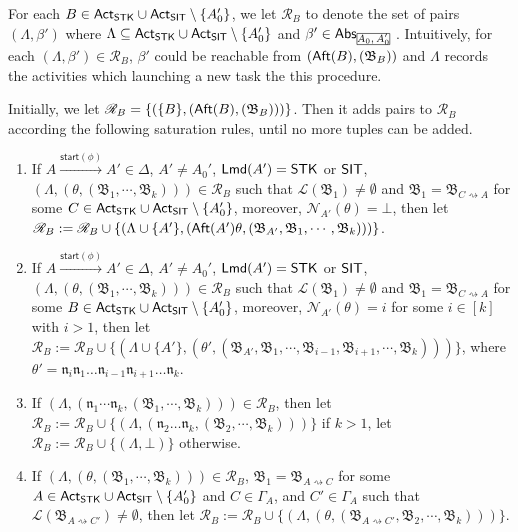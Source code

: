 \documentclass[preprint,12pt]{elsarticle}
\newcommand\rectangled[1]{\tikz[baseline=(torect.base)]{
    \node[shape = rectangle, draw, inner sep=0pt, outer sep = 0pt] (torect) {#1}
    }
}
\newcommand{\mrectangled}[1]{\text{\rectangled{\ensuremath{#1}}}}
\newcommand{\mhcancel}[1]{\mrectangled{#1}}
\newcommand\act{{\sf Act}}
\newcommand\aft{{\sf Aft}}
\newcommand\lmd{{\sf Lmd}}
\newcommand\singletask{{\sf STK}}
\newcommand\singleinstance{{\sf SIT}}
\newcommand\startactivity{{\mathsf{start} }}
\newcommand\abs{{\mathsf{Abs} }}
\newcommand\namefun{\mathcal{N}}
\newcommand\aname{\mathfrak{n}}
\newcommand\AutReach{\mathscr{R}}
\newcommand{\STK}{\mathsf{STK}}
\newcommand{\SIT}{\mathsf{SIT}}
\newcommand\AutB{{\mathfrak{B} }}
\newcommand\Lang{{\mathscr{L} }}
\begin{document}
{For each $B\in\act_{\STK}\cup\act_{\SIT}\setminus\{A_0'\}$, we let $\AutReach_{B}$ to denote the set of pairs $(\Lambda, \beta')$ where $\Lambda \subseteq \act_{\STK}\cup\act_{\SIT}\setminus\{A_0'\}$ and $\beta' \in \abs_{\mhcancel{A_0, A_0'}}$. Intuitively, for each $(\Lambda, \beta') \in \AutReach_{B}$, $\beta'$ could be reachable from $(\aft(B),(\AutB_{B}))$ and $\Lambda$ records the activities which launching a new task the this procedure.

Initially, we let $\AutReach_{B} = \{(\{B\}, (\aft(B), (\AutB_B)))\}$. Then it adds pairs to $\AutReach_{B}$ according the following saturation rules, until no more tuples can be added.

\smallskip
\fbox
{
\begin{minipage}{0.9\textwidth}
\begin{enumerate}
    \item If $A \xrightarrow{\startactivity(\phi)}A' \in\Delta$, $A'\neq A_0'$, $\lmd(A')=\STK$ or $\singleinstance$, $(\Lambda,(\theta, (\AutB_1,\cdots,\AutB_k))) \in \AutReach_{B}$ such that $\Lang(\AutB_1) \neq \emptyset$ and $\AutB_1 = \AutB_{C\rightsquigarrow A}$ for some $C \in \act_\singletask\cup\act_\singleinstance\setminus\{A_0'\}$, moreover, $\namefun_{A'}(\theta) = \bot$,
    then let $\AutReach_{B}: = \AutReach_{B} \cup \{(\Lambda\cup\{A'\},(\aft(A')\theta, (\AutB_{A'},\AutB_1,\cdots,\AutB_k)))\}$.
    \item If $A \xrightarrow{\startactivity(\phi)}A' \in\Delta$, $A'\neq A_0'$, $\lmd(A')=\STK$ or $\singleinstance$, $(\Lambda,(\theta, (\AutB_1,\cdots,\AutB_k))) \in \AutReach_{B}$ such that $\Lang(\AutB_1) \neq \emptyset$ and $\AutB_1 = \AutB_{C\rightsquigarrow A}$ for some $B \in \act_\singletask\cup\act_\singleinstance\setminus\{A_0'\}$, moreover, $\namefun_{A'}(\theta) = i$ for some $i \in [k]$ with $i > 1$, 
        then let $\AutReach_{B}:= \AutReach_{B} \cup \{(\Lambda\cup\{A'\},(\theta', (\AutB_{A'}, \AutB_1, \cdots,\AutB_{i-1},\AutB_{i+1},\cdots,\AutB_{k})))\}$, where $\theta' = \aname_i\aname_1\dots\aname_{i-1}\aname_{i+1}\dots\aname_k$. 
    \item If $(\Lambda,(\aname_1 \cdots \aname_k, (\AutB_1,\cdots,\AutB_k))) \in \AutReach_{B}$, then let $\AutReach_{B} := \AutReach_{B} \cup \{(\Lambda,(\aname_2\dots\aname_k, (\AutB_2,\cdots,\AutB_k)))\}$ if $k > 1$, let $\AutReach_{B} := \AutReach_{B} \cup \{(\Lambda,\bot)\}$ otherwise.
%
    \item If $(\Lambda,(\theta, (\AutB_1,\cdots,\AutB_k))) \in \AutReach_{B}$, $\AutB_1 = \AutB_{A\rightsquigarrow C}$ for some $A\in\act_{\STK}\cup\act_{\SIT}\setminus\{A_0'\}$ and $C \in \Gamma_A$, and $C'  \in \Gamma_A$ such that $\Lang(\AutB_{A\rightsquigarrow C'}) \neq \emptyset$, then let 
    $\AutReach_{B} := \AutReach_{B} \cup \{(\Lambda,(\theta, (\AutB_{A\rightsquigarrow C'}, \AutB_2,\cdots,\AutB_k)))\}$. 


\end{enumerate}
\end{minipage}}}
\end{document}
